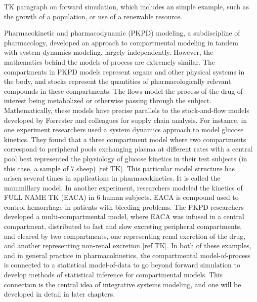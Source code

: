 TK paragraph on forward simulation, which includes an simple example,
such as the growth of a population, or use of a renewable resource.

Pharmacokinetic and pharmacodynamic (PKPD) modeling, a subdiscipline
of pharmacology, developed an approach to compartmental modeling in
tandem with system dynamics modeling, largely independently.  However,
the mathematics behind the models of process are extremely
similar. The compartments in PKPD models represent organs and other
physical systems in the body, and stocks represent the quantities of
pharmacologically relevant compounds in these compartments.  The flows
model the process of the drug of interest being metabolized or
otherwise passing through the subject. Mathematically, these models
have precise parallels to the stock-and-flow models developed by
Forrester and colleagues for supply chain analysis. For instance, in
one experiment researchers used a system dynamics approach to model
glucose kinetics. They found that a three compartment model where two
compartments correspond to peripheral pools exchanging plasma at
different rates with a central pool best represented the physiology of
glucose kinetics in their test subjects (in this case, a sample of 7
sheep) [ref TK]. This particular model structure has arisen several
times in applications in pharmacokinetics. It is called the mammillary
model. In another experiment, researchers modeled the kinetics of FULL
NAME TK (EACA) in 6 human subjects. EACA is compound used to control
hemorrhage in patients with bleeding problems. The PKPD researchers
developed a multi-compartmental model, where EACA was infused in a
central compartment, distributed to fast and slow excreting peripheral
compartments, and cleared by two compartments, one representing renal
excretion of the drug, and another representing non-renal excretion
[ref TK]. In both of these examples, and in general practice in
pharmacokinetics, the compartmental model-of-process is connected to a
statistical model-of-data to go beyond forward simulation to develop
methods of statistical inference for compartmental models. This
connection is the central idea of integrative systems modeling, and
one will be developed in detail in later chapters.

